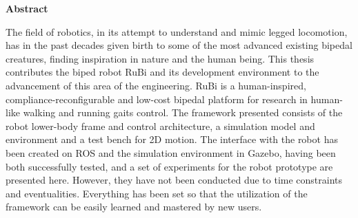 \newenvironment{abstract}%
    {\null\vfill\begin{center}%
    \bfseries Abstract\end{center}}%
    {\vfill\null}
        \begin{abstract}
        The field of robotics, in its attempt to understand and mimic legged locomotion, has in the past decades given birth to some of the most advanced existing bipedal creatures, finding inspiration in nature and the human being.
        This thesis contributes the biped robot RuBi and its development environment to the advancement of this area of the engineering.
        RuBi is a human-inspired, compliance-reconfigurable and low-cost bipedal platform for research in human-like walking and running gaits control.
        The framework presented consists of the robot lower-body frame and control architecture, a simulation model and environment and a test bench for 2D motion.
        The interface with the robot has been created on ROS and the simulation environment in Gazebo, having been both successfully tested, and a set of experiments for the robot prototype are presented here.
        However, they have not been conducted due to time constraints and eventualities.
        Everything has been set so that the utilization of the framework can be easily learned and mastered by new users.
        \end{abstract}